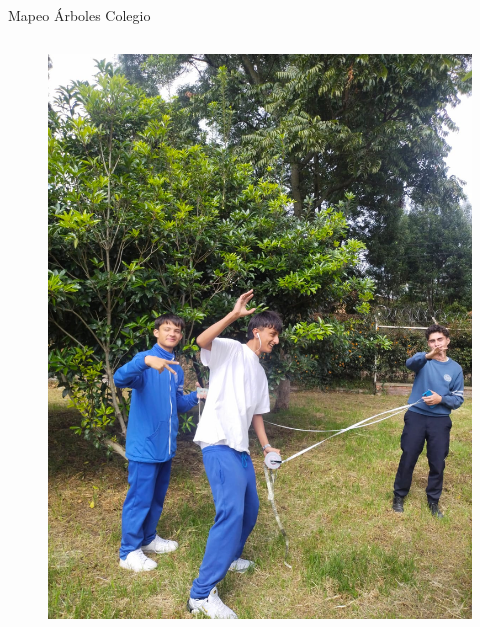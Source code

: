 \documentclass{beamer}
\begin{document}
\begin{frame}{Mapeo Árboles Colegio}
\begin{columns}
    \begin{column}{.5\textwidth}
      \begin{figure}
        \centering
        \includegraphics[width=\textwidth]{img/Mapeo2.jpg}
      \end{figure}
    \end{column}
  \end{columns}


\end{frame}
\end{document}
